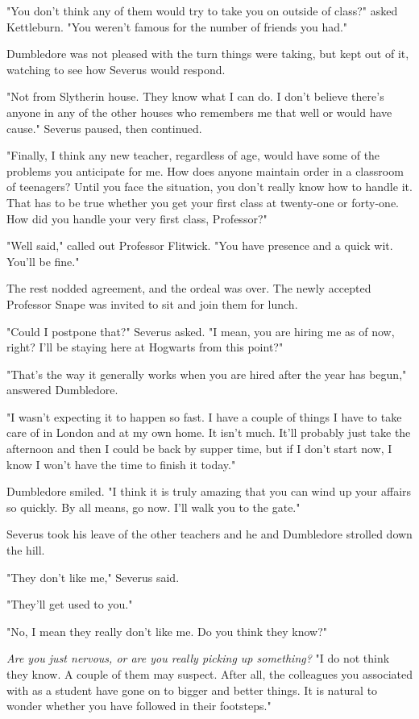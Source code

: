 "You don't think any of them would try to take you on outside of class?" asked Kettleburn. "You weren't famous for the number of friends you had."

Dumbledore was not pleased with the turn things were taking, but kept out of it, watching to see how Severus would respond.

"Not from Slytherin house. They know what I can do. I don't believe there's anyone in any of the other houses who remembers me that well or would have cause." Severus paused, then continued.

"Finally, I think any new teacher, regardless of age, would have some of the problems you anticipate for me. How does anyone maintain order in a classroom of teenagers? Until you face the situation, you don't really know how to handle it. That has to be true whether you get your first class at twenty-one or forty-one. How did you handle your very first class, Professor?"

"Well said," called out Professor Flitwick. "You have presence and a quick wit. You'll be fine."

The rest nodded agreement, and the ordeal was over. The newly accepted Professor Snape was invited to sit and join them for lunch.

"Could I postpone that?" Severus asked. "I mean, you are hiring me as of now, right? I'll be staying here at Hogwarts from this point?"

"That's the way it generally works when you are hired after the year has begun," answered Dumbledore.

"I wasn't expecting it to happen so fast. I have a couple of{\el} things I have to take care of in London and at my own home. It isn't much. It'll probably just take the afternoon and then I could be back by supper time, but if I don't start now, I know I won't have the time to finish it today."

Dumbledore smiled. "I think it is truly amazing that you can wind up your affairs so quickly. By all means, go now. I'll walk you to the gate."

Severus took his leave of the other teachers and he and Dumbledore strolled down the hill.

"They don't like me," Severus said.

"They'll get used to you."

"No, I mean they really don't like me. Do you think they know?"

\emph{Are you just nervous, or are you really picking up something?} "I do not think they know. A couple of them may suspect. After all, the colleagues you associated with as a student have gone on to bigger and better things. It is natural to wonder whether you have followed in their footsteps."


